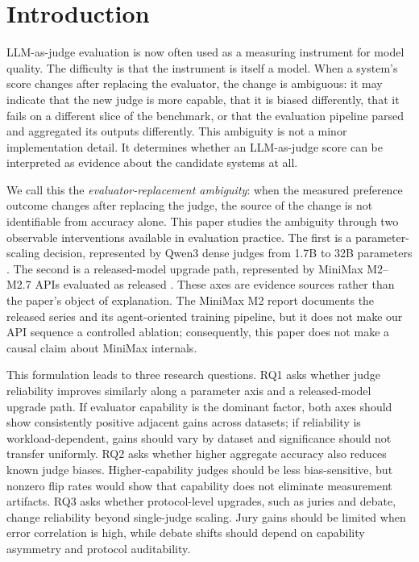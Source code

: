 \documentclass[sigconf,nonacm]{acmart}
\begin{document}

\maketitle

\section{Introduction}

LLM-as-judge evaluation is now often used as a measuring instrument for model quality. The difficulty is that the instrument is itself a model. When a system's score changes after replacing the evaluator, the change is ambiguous: it may indicate that the new judge is more capable, that it is biased differently, that it fails on a different slice of the benchmark, or that the evaluation pipeline parsed and aggregated its outputs differently. This ambiguity is not a minor implementation detail. It determines whether an LLM-as-judge score can be interpreted as evidence about the candidate systems at all.

We call this the \emph{evaluator-replacement ambiguity}: when the measured preference outcome changes after replacing the judge, the source of the change is not identifiable from accuracy alone. This paper studies the ambiguity through two observable interventions available in evaluation practice. The first is a parameter-scaling decision, represented by Qwen3 dense judges from 1.7B to 32B parameters \citep{qwen3}. The second is a released-model upgrade path, represented by MiniMax M2--M2.7 APIs evaluated as released \citep{minimax2026m2}. These axes are evidence sources rather than the paper's object of explanation. The MiniMax M2 report documents the released series and its agent-oriented training pipeline, but it does not make our API sequence a controlled ablation; consequently, this paper does not make a causal claim about MiniMax internals.

This formulation leads to three research questions. RQ1 asks whether judge reliability improves similarly along a parameter axis and a released-model upgrade path. If evaluator capability is the dominant factor, both axes should show consistently positive adjacent gains across datasets; if reliability is workload-dependent, gains should vary by dataset and significance should not transfer uniformly. RQ2 asks whether higher aggregate accuracy also reduces known judge biases. Higher-capability judges should be less bias-sensitive, but nonzero flip rates would show that capability does not eliminate measurement artifacts. RQ3 asks whether protocol-level upgrades, such as juries and debate, change reliability beyond single-judge scaling. Jury gains should be limited when error correlation is high, while debate shifts should depend on capability asymmetry and protocol auditability.
\end{document}
